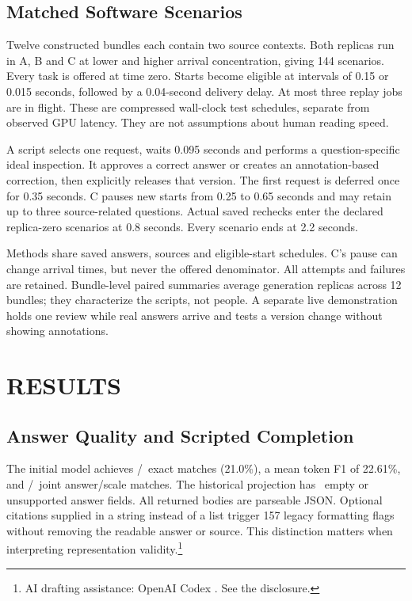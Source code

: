 \documentclass[a4paper,twoside]{article}
\newcommand{\credit}{\footnote{AI drafting assistance: OpenAI Codex \cite{codex}. See the disclosure.}}
\begin{document}
\subsection{Matched Software Scenarios}
Twelve constructed bundles each contain two source contexts. Both replicas run in
A, B and C at lower and higher arrival concentration, giving 144 scenarios.
Every task is offered at time zero. Starts become eligible at intervals of 0.15
or 0.015 seconds, followed by a 0.04-second delivery delay. At most three replay
jobs are in flight. These are compressed wall-clock test schedules, separate from
observed GPU latency. They are not assumptions about human reading speed.

A script selects one request, waits 0.095 seconds and performs a question-specific
ideal inspection. It approves a correct answer or creates an annotation-based
correction, then explicitly releases that version. The first request is deferred
once for 0.35 seconds. C pauses new starts from 0.25 to 0.65 seconds and may retain
up to three source-related questions. Actual saved rechecks enter the declared
replica-zero scenarios at 0.8 seconds. Every scenario ends at 2.2 seconds.

Methods share saved answers, sources and eligible-start schedules. C's pause can
change arrival times, but never the offered denominator. All attempts and failures
are retained. Bundle-level paired summaries average generation replicas across
12 bundles; they characterize the scripts, not people. A separate live demonstration
holds one review while real answers arrive and tests a version change without
showing annotations.

\section{RESULTS}
\subsection{Answer Quality and Scripted Completion}
The initial model achieves \ExactCount/\AnswerCount\ exact matches (21.0\%), a
mean token F1 of 22.61\%, and \JointCount/\AnswerCount\ joint answer/scale matches.
The historical projection has \EmptyCount\ empty or unsupported answer fields.
All returned bodies are parseable JSON.
Optional citations supplied in a string instead of a list trigger 157 legacy
formatting flags without removing the readable answer or source. This distinction
matters when interpreting representation validity.\credit
\end{document}
